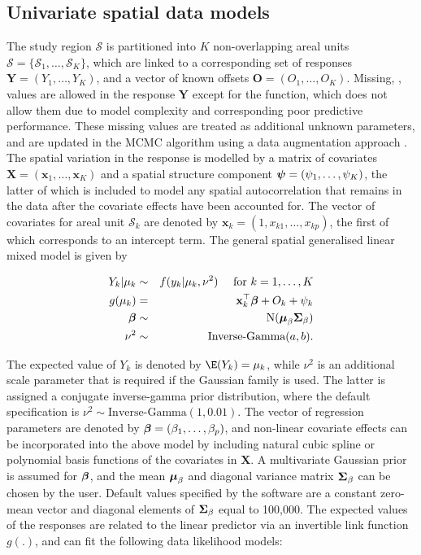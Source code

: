 \documentclass[article,shortnames,nojss]{jss}
\newcommand{\bd}[1]{\ensuremath{\mbox{\boldmath $#1$}}}
\begin{document}
\subsection{Univariate spatial data models}
The study region $\mathcal{S}$ is partitioned into $K$ non-overlapping areal units $\mathcal{S}=\{\mathcal{S}_{1},\ldots,\mathcal{S}_{K}\}$, which are linked to a corresponding set of responses $\mathbf{Y}=(Y_{1},\ldots,Y_{K})$, and a vector of known offsets $\mathbf{O}=(O_{1},\ldots,O_{K})$. Missing, , values are allowed in the response $\mathbf{Y}$ except for the  function, which does not allow them due to model complexity and corresponding poor predictive performance. These missing values are treated as additional unknown parameters, and are updated in the MCMC algorithm using a data augmentation approach \cite{tanner1987}. The spatial variation in the response is modelled by a matrix of covariates $\mathbf{X}=(\mathbf{x}_{1},\ldots,\mathbf{x}_{K})$ and  a spatial structure component $\bd{\psi}=(\psi_{1},\ldots,\psi_{K})$, the latter of which is included to model any spatial autocorrelation that remains in the data after the covariate effects have been accounted for. The vector of covariates for areal unit $\mathcal{S}_{k}$ are denoted by $\mathbf{x}_{k}=(1, x_{k1},\ldots,x_{kp})$, the first of which corresponds to an intercept term. The general spatial generalised linear mixed model is given by


\begin{eqnarray}
Y_{k}|\mu_{k}&\sim&f(y_{k}|\mu_{k},\nu^{2})~~~~\mbox{for }k=1,\ldots,K\label{equation likelihood}\\
g(\mu_{k})&=& \mathbf{x}_{k}^{\top}\bd{\beta} + O_k + \psi_{k}\nonumber\\
\bd{\beta}&\sim&\mbox{N}(\bd{\mu}_{\beta} \bd{\Sigma}_{\beta})\nonumber\\
\nu^2 &\sim& \mbox{Inverse-Gamma}(a,b).\nonumber
\end{eqnarray}

The expected value of $Y_{k}$ is denoted by $\E(Y_{k})=\mu_{k}$, while $\nu^{2}$ is an additional scale parameter that is required if the Gaussian family is used. The latter is assigned a conjugate inverse-gamma prior distribution,  where the default specification is $\nu^{2}\sim\mbox{Inverse-Gamma}(1, 0.01)$. The vector of regression parameters are denoted by $\bd{\beta}=(\beta_{1},\ldots,\beta_{p})$, and non-linear covariate effects can be incorporated into the above model by including natural cubic spline or polynomial basis functions of the covariates in $\mathbf{X}$. A multivariate Gaussian prior is assumed for $\bd{\beta}$, and the mean $\bd{\mu}_{\beta}$ and diagonal variance matrix $\bd{\Sigma}_{\beta}$ can be chosen by the user. Default values specified by the software are a constant zero-mean vector and diagonal elements of  $\bd{\Sigma}_{\beta}$ equal to 100,000. The expected values of the responses are related to the linear predictor via an invertible link function $g(.)$, and  can fit the following data likelihood models:
\end{document}
